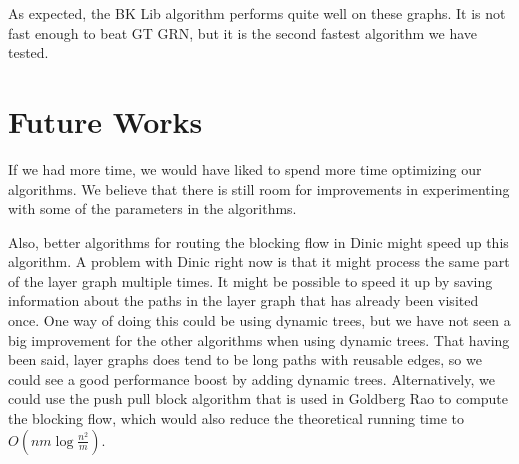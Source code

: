 As expected, the BK Lib algorithm performs quite well on these graphs.
It is not fast enough to beat GT GRN, but it is the second fastest algorithm we have tested.

\section{Future Works}
If we had more time, we would have liked to spend more time optimizing our algorithms.
We believe that there is still room for improvements in experimenting with some of the parameters in the algorithms.

Also, better algorithms for routing the blocking flow in Dinic might speed up this algorithm.
A problem with Dinic right now is that it might process the same part of the layer graph multiple times.
It might be possible to speed it up by saving information about the paths in the layer graph that has already been visited once.
One way of doing this could be using dynamic trees, but we have not seen a big improvement for the other algorithms when using dynamic trees.
That having been said, layer graphs does tend to be long paths with reusable edges, so we could see a good performance boost by adding dynamic trees.
Alternatively, we could use the push pull block algorithm that is used in Goldberg Rao to compute the blocking flow, which would also reduce the theoretical running time to $O\left(nm\log{\frac{n^2}{m}}\right)$.

